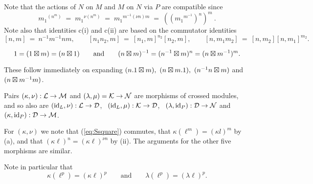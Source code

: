 Note that the actions of  $N$  on  $M$  and  $M$  
on  $N$  via  $P$
are compatible since
$$
{m_1}^{(n^m)} \;=\; {m_1}^{\nu(n^m)} \;=\; {m_1}^{m^{-1}(\nu n)m}
\;=\; (({m_1}^{m^{-1}})^n)^m~.
$$
Note also that identities c(i) and c(ii) are based on the commutator identities 
$$
[n,m] ~=~ n^{-1}m^{-1}nm, \qquad 
[n_1n_2,m] ~=~ [n_1,m]^{n_2}[n_2,m], \qquad 
[n,m_1m_2] ~=~ [n,m_2][n,m_1]^{m_2} .
$$

\begin{lem} 
$$
1 = (1 \boxtimes m) = (n \boxtimes 1 ) 
\qquad\mbox{and}\qquad 
(n \boxtimes m)^{-1} = (n^{-1} \boxtimes m)^n = (n \boxtimes m^{-1})^m. 
$$
\end{lem}
\begin{pf}
These follow immediately on expanding 
$(n.1 \boxtimes m),\ (n \boxtimes m.1),\ (n^{-1}n \boxtimes m)$ and $(n \boxtimes m^{-1}m)$. 
\end{pf}

\begin{lem}
Pairs $(\kappa,\nu) : \mathcal{L} \to \mathcal{M}$ and  $(\lambda,\mu) = \mathcal{K} \to \mathcal{N}$ 
are morphisms of crossed modules, and so also are
$(\mathrm{id}_{L},\nu) : \mathcal{L} \to \mathcal{D}$,~ $(\mathrm{id}_{L},\mu) : \mathcal{K} \to \mathcal{D}$,~
$(\lambda,\mathrm{id}_{P}) : \mathcal{D} \to \mathcal{N}$  and  $(\kappa,\mathrm{id}_{P}) : \mathcal{D} \to \mathcal{M}$.
\end{lem}
\begin{pf}
For $(\kappa,\nu)$ we note that (\ref{eq:Ssquare}) commutes,
that  $\kappa(\ell^m) = (\kappa l)^m$  by (a),
and that  $(\kappa \ell)^n = (\kappa \ell)^{\nu n}$  by (ii).
The arguments for the other five morphisms are similar.
\end{pf}

\medskip\noindent
Note in particular that
$$
\kappa(\ell^p) = (\kappa \ell)^p
\qquad \mbox{and} \qquad
\lambda(\ell^p) = (\lambda \ell)^p.
$$

